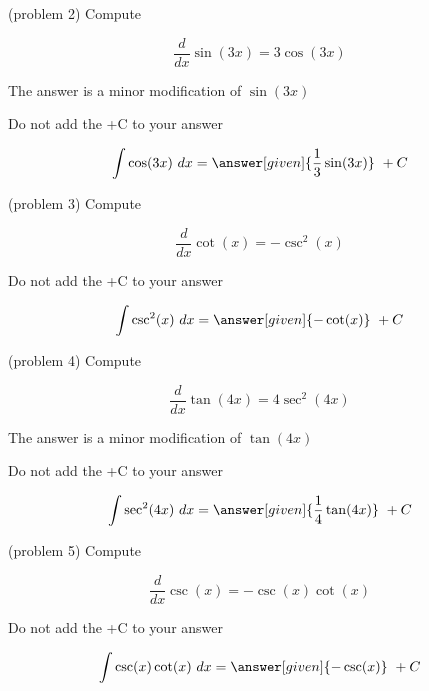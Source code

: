 \documentclass[handout]{ximera}
\begin{document}
\begin{problem}(problem 2)
Compute
\begin{hint}
\[
\frac{d}{dx} \sin(3x) = 3\cos(3x)
\]
\end{hint}
\begin{hint}
The answer is a minor modification of $\sin(3x)$
\end{hint}
\begin{hint}
\begin{center}
Do not add the +C to your answer
\end{center}
\end{hint}

\[
\int \cos(3x) \ dx =
\answer[given]{\frac13 \sin(3x)} \ + C
\]
\end{problem}



\begin{problem}(problem 3)
Compute 

\begin{hint}
\[
\frac{d}{dx} \cot(x) = -\csc^2(x)
\]
\end{hint}
\begin{hint}
\begin{center}
Do not add the +C to your answer
\end{center}
\end{hint}

\[
\int \csc^2(x) \ dx =
\answer[given]{-\cot(x)} \ + C
\]
\end{problem}

\begin{problem}(problem 4)
Compute 

\begin{hint}
\[
\frac{d}{dx} \tan(4x) = 4\sec^2(4x)
\]
\end{hint}
\begin{hint}
The answer is a minor modification of $\tan(4x)$
\end{hint}
\begin{hint}
\begin{center}
Do not add the +C to your answer
\end{center}
\end{hint}

\[
\int \sec^2(4x) \ dx =
\answer[given]{\frac14\tan(4x)} \ + C
\]
\end{problem}




\begin{problem}(problem 5)
Compute 

\begin{hint}
\[
\frac{d}{dx} \csc(x) = -\csc(x)\cot(x)
\]
\end{hint}
\begin{hint}
\begin{center}
Do not add the +C to your answer
\end{center}
\end{hint}

\[
\int \csc(x)\cot(x) \ dx =
\answer[given]{-\csc(x)} \ + C
\]
\end{problem}
\end{document}
